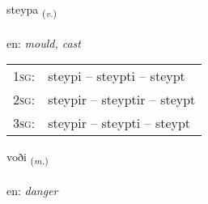 \documentclass[frontgrid, backgrid]{flacards}\usepackage[]{graphicx}\usepackage[]{xcolor}
\begin{document}
\renewcommand{\flhead}{\vskip5pt \fboxsep=0pt {\small\bfseries\footnotesize Sagnorð | Verb}}
\renewcommand{\fcfoot}{\vskip5pt \fboxsep=0pt \hspace{2pt}{\small\bfseries\footnotesize 3K}}

\renewcommand{\blhead}{\vskip5pt {\small\bfseries\footnotesize Sagnorð | Verb }}
\renewcommand{\bcfoot}{\vskip5pt \hspace{2pt}{\small\bfseries\footnotesize 3K}}


{steypa \small{\textsubscript{(\textit{v.})}} \\[1ex] %
\textphonetic{[steiːpa]} \\
en: \emph{mould, cast} \\  [2ex]
\renewcommand*{\arraystretch}{0.8}
\begin{tabular}{p{1cm}l}
\textsc{1sg}: & steypi -- steypti -- steypt \\ 
\textsc{2sg}: & steypir -- steyptir -- steypt \\ 
\textsc{3sg}: & steypir -- steypti -- steypt \\ 
\end{tabular}
}

\renewcommand{\flhead}{\vskip5pt \fboxsep=0pt {\small\bfseries\footnotesize Nafnorð | Noun}}
\renewcommand{\fcfoot}{\vskip5pt \fboxsep=0pt \hspace{2pt}{\small\bfseries\footnotesize 3K}}

\renewcommand{\blhead}{\vskip5pt {\small\bfseries\footnotesize Nafnorð | Noun }}
\renewcommand{\bcfoot}{\vskip5pt \hspace{2pt}{\small\bfseries\footnotesize 3K}}


{voði \small{\textsubscript{(\textit{m.})}} \\[1ex] %
\textphonetic{[vɔːðɪ]} \\
en: \emph{danger} \\  [2ex]
\renewcommand*{\arraystretch}{0.8}
}
\end{document}
